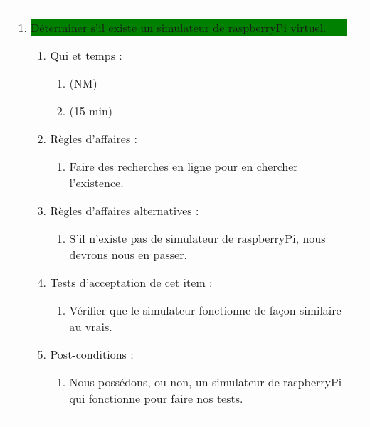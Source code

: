 \begin{longtable}{|l|p{}|}
\begin{enumerate}[label*=\arabic*.]
        \item \colorbox{Green}{\parbox{13cm}{Déterminer s'il existe un simulateur de raspberryPi virtuel.}}
                \begin{enumerate}[label*=\arabic*.]
                                \item Qui et temps :
                                \begin{enumerate}[label*=\arabic*.]
                                    \item (NM)
                                    \item (15 min)
                                \end{enumerate}
                                \item Règles d'affaires :
                                \begin{enumerate}[label*=\arabic*.]
                                    \item Faire des recherches en ligne pour en chercher l'existence.
                                \end{enumerate}
                                \item Règles d'affaires alternatives :
                                \begin{enumerate}[label*=\arabic*.]
                                    \item S'il n'existe pas de simulateur de raspberryPi, nous devrons nous en passer.
                                \end{enumerate}
                                \item Tests d'acceptation de cet item :
                                \begin{enumerate}[label*=\arabic*.]
                                    \item Vérifier que le simulateur fonctionne de façon similaire au vrais.
                                \end{enumerate}
                                \item Post-conditions :
                                \begin{enumerate}[label*=\arabic*.]
                                    \item Nous possédons, ou non, un simulateur de raspberryPi qui fonctionne pour faire nos tests.
                                \end{enumerate}
                            \end{enumerate}
                         \end{enumerate} \\


\end{longtable}
